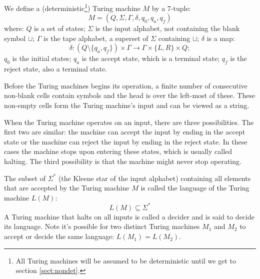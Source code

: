   We define a (deterministic\footnote{All Turing machines will be assumed to be deterministic until we get to section \ref{sect:nondet}.}) Turing machine \( M \) by a 7-tuple:
  \[ M = ( Q, \Sigma, \Gamma, \delta, q_0, q_a, q_f ) \]
  where:
  \( Q \) is a set of states;
  \( \Sigma \) is the input alphabet, not containing the blank symbol \( \sqcup \);
  \( \Gamma \) is the tape alphabet, a superset of \( \Sigma \) containing \( \sqcup \);
  \( \delta \) is a map:
  \[ \delta: (Q \setminus \{ q_a, q_f \}) \times \Gamma \rightarrow \Gamma \times \{ L, R \} \times Q; \]
  \( q_0 \) is the initial states;
  \( q_a \) is the accept state, which is a terminal state;
  \( q_f \) is the reject state, also a terminal state.  
  
  Before the Turing machines begins its operation, a finite number of consecutive non-blank cells contain symbols and the head is over the left-most of these.
  These non-empty cells form the Turing machine's input and can be viewed as a string.

  When the Turing machine operates on an input, there are three possibilities.
  The first two are similar: the machine can accept the input by ending in the accept state or the machine can reject the input by ending in the reject state.
  In these cases the machine stops upon entering these states, which is usually called halting.
  The third possibility is that the machine might never stop operating.
  
  The subset of \( \Sigma^* \) (the Kleene star of the input alphabet) containing all elements that are accepted by the Turing machine \( M \) is called the language of the Turing machine \( L(M) \):
  \[ L(M) \subseteq \Sigma^* \]
  A Turing machine that halts on all inputs is called a decider and is said to decide its language.
  Note it's possible for two distinct Turing machines \( M_1 \) and \( M_2 \) to accept or decide the same language: \( L( M_1 ) = L( M_2 ) \).

